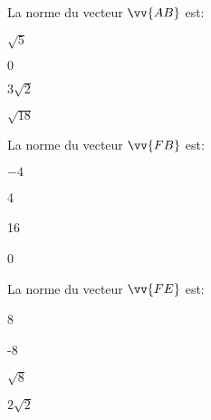 \begin{QCM}
\begin{GroupeQCM}
    \begin{exercice}
      La norme du vecteur $\vv{AB}$ est:
      \begin{ChoixQCM}{4}
      \item $\sqrt{5}$
      \item $0$
      \item $3\sqrt{2}$
      \item $\sqrt{18}$
      \end{ChoixQCM}
\begin{corrige}
   \end{corrige}
    \end{exercice}
    
        \begin{exercice}
      La norme du vecteur $\vv{FB}$ est:
      \begin{ChoixQCM}{4}
      \item $-4$
      \item 4
      \item 16
      \item 0
      \end{ChoixQCM}
\begin{corrige}
   \end{corrige}
    \end{exercice}
    
        \begin{exercice}
      La norme du vecteur $\vv{FE}$ est:
      \begin{ChoixQCM}{4}
      \item 8
      \item -8
      \item $\sqrt{8}$
      \item $2\sqrt{2}$
      \end{ChoixQCM}
\begin{corrige}
   \end{corrige}
    \end{exercice}

\end{GroupeQCM}
\end{QCM}

  